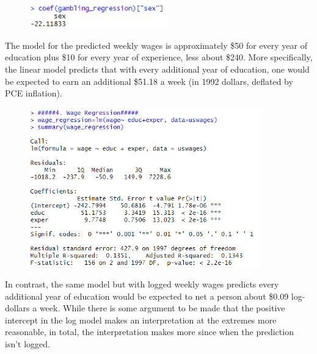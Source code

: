 \documentclass[12pt, letterpaper]{article}
\theoremstyle{definition}
\numberwithin{equation}{section}
\newcommand{\+}[1]{+_{\scalebox{.375}{#1}}}
\newcommand{\1}{\mathbbm{1}}
\begin{document}
\begin{figure}[H]
	\centering
	\includegraphics[width=6cm]{Gambling Coef Sex}
\end{figure}


\newpage
\noindent\textbf{}
\vspace{\baselineskip}

The model for the predicted weekly wages is approximately \$50 for every year of education plus \$10 for every year of experience, less about \$240. More specifically, the linear model predicts that with every additional year of education, one would be expected to earn an additional \$51.18 a week (in 1992 dollars, deflated by PCE inflation).


\begin{figure}[H]
	\centering
	\includegraphics[width=10cm]{Wage Regression}
\end{figure}

In contrast, the same model but with logged weekly wages predicts every additional year of education would be expected to net a person about \$0.09 log-dollars a week. While there is some argument to be made that the positive intercept in the log model makes an interpretation at the extremes more reasonable, in total, the interpretation makes more since when the prediction isn't logged.
\end{document}
